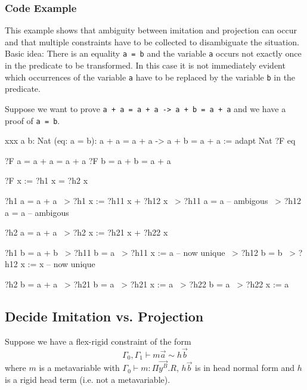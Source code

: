 \subsubsection{Code Example}


This example shows that ambiguity between imitation and projection can occur and
that multiple constraints have to be collected to disambiguate the situation.
Basic idea: There is an equality {\tt a = b} and the variable {\tt a} occurs not
exactly once in the predicate to be transformed. In this case it is not
immediately evident which occurrences of the variable {\tt a} have to be
replaced by the variable {\tt b} in the predicate.

Suppose we want to prove {\tt a + a = a + a -> a + b = a + a} and we have a
proof of {\tt a = b}.

\begin{alba}
    xxx {a b: Nat} (eq: a = b):  a + a = a + a -> a + b = a + a
    :=
        adapt {Nat} {?F} eq
\end{alba}


\begin{alba}
    ?F a = a + a = a + a
    ?F b = a + b = a + a

    ?F x := ?h1 x = ?h2 x

    ?h1 a = a + a       ~> ?h1 x := ?h11 x + ?h12 x
                        ~> ?h11 a = a       -- ambigous
                        ~> ?h12 a = a       -- ambigous

    ?h2 a = a + a       ~> ?h2 x := ?h21 x + ?h22 x

    ?h1 b = a + b       ~> ?h11 b = a           ~> ?h11 x := a  -- now unique
                        ~> ?h12 b = b           ~> ?h12 x := x  -- now unique

    ?h2 b = a + a       ~> ?h21 b = a           ~> ?h21 x := a
                        ~> ?h22 b = a           ~> ?h22 x := a

\end{alba}








\subsection{Decide Imitation vs. Projection}

Suppose we have a flex-rigid constraint of the form
$$
    \Gamma_0, \Gamma_1
    \vdash
    m \vec a \sim h \vec b
$$
where $m$ is a metavariable with
$\Gamma_0 \vdash m : \Pi \vec {y^B}. R$,
$h \vec b$ is in head normal form and $h$ is a
rigid head term (i.e. not a metavariable).

